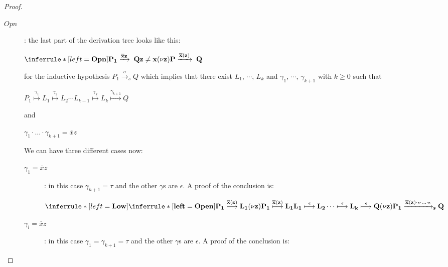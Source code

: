 \begin{proposition}
\begin{proof}
\begin{description}
      \item[$Opn$]: 
	the last part of the derivation tree looks like this:
	\begin{center}
	  $$	 
	\end{center}
	for the inductive hypothesis $P_{1} \xrightarrow{\sigma}_{s} Q$ which implies that there exist $L_{1}$, $\cdots$, $L_{k}$ and $\gamma_{1}$, $\cdots$, $\gamma_{k+1}$ with $k$ such that 
	\begin{center}
	  $P_{1}  L_{1}   L_{2} \cdots L_{k-1}  L_{k}  Q$ 
	\end{center}
	and 
	\begin{center}
	  $\gamma_{1} \cdot \ldots \cdot \gamma_{k+1} =  z$
	\end{center}
	We can have three different cases now: 
	\begin{description}
	  \item[$\gamma_{1}=z$]:
	    in this case $\gamma_{h+1}=\tau$ and the other $\gamma$s are $\epsilon$. A proof of the conclusion is:
	    \begin{center}
	      $$	  
	    \end{center}
	  \item[$\gamma_{i}=z$]:
	    in this case $\gamma_{1}=\gamma_{k+1}=\tau$ and the other $\gamma$s are $\epsilon$. A proof of the conclusion is:
	    \begin{center}

\end{center}
\end{description}
\end{description}
\end{proof}
\end{proposition}
